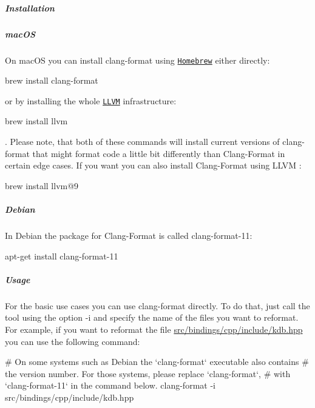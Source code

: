 \label{invalid_invalid}%
%
\subparagraph*{Installation}

\subparagraph*{mac\+OS}

On mac\+OS you can install {\ttfamily clang-\/format} using \href{https://brew.sh}{\tt Homebrew} either directly\+:


\begin{DoxyCode}
brew install clang-format
\end{DoxyCode}


or by installing the whole \href{http://llvm.org}{\tt L\+L\+VM} infrastructure\+:


\begin{DoxyCode}
brew install llvm
\end{DoxyCode}


. Please note, that both of these commands will install current versions of {\ttfamily clang-\/format} that might format code a little bit differently than Clang-\/\+Format {} in certain edge cases. If you want you can also install Clang-\/\+Format {} using L\+L\+VM {}\+:


\begin{DoxyCode}
brew install llvm@9
\end{DoxyCode}


\subparagraph*{Debian}

In Debian the package for Clang-\/\+Format {} is called {\ttfamily clang-\/format-\/11}\+:


\begin{DoxyCode}
apt-get install clang-format-11
\end{DoxyCode}


\label{invalid_invalid}%
%
\subparagraph*{Usage}

For the basic use cases you can use {\ttfamily clang-\/format} directly. To do that, just call the tool using the option {\ttfamily -\/i} and specify the name of the files you want to reformat. For example, if you want to reformat the file {\ttfamily \hyperlink{kdb_8hpp}{src/bindings/cpp/include/kdb.\+hpp}} you can use the following command\+:


\begin{DoxyCode}
# On some systems such as Debian the `clang-format` executable also contains
# the version number. For those systems, please replace `clang-format`,
# with `clang-format-11` in the command below.
clang-format -i src/bindings/cpp/include/kdb.hpp
\end{DoxyCode}


